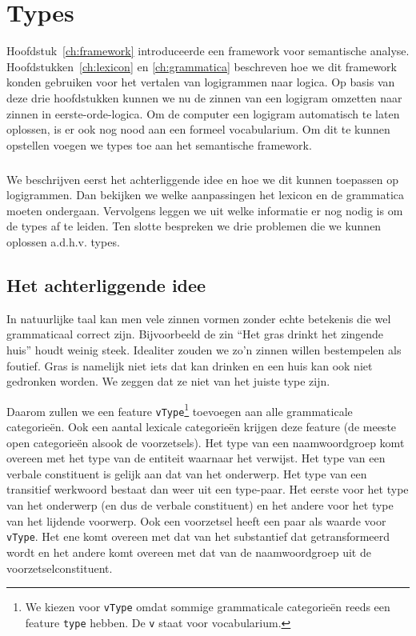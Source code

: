 \chapter{Types}
\label{ch:types}

Hoofdstuk~\ref{ch:framework} introduceerde een framework voor semantische analyse. Hoofdstukken~\ref{ch:lexicon} en \ref{ch:grammatica} beschreven hoe we dit framework konden gebruiken voor het vertalen van logigrammen naar logica. Op basis van deze drie hoofdstukken kunnen we nu de zinnen van een logigram omzetten naar zinnen in eerste-orde-logica. Om de computer een logigram automatisch te laten oplossen, is er ook nog nood aan een formeel vocabularium. Om dit te kunnen opstellen voegen we types toe aan het semantische framework.

\paragraph{} We beschrijven eerst het achterliggende idee en hoe we dit kunnen toepassen op logigrammen. Dan bekijken we welke aanpassingen het lexicon en de grammatica moeten ondergaan. Vervolgens leggen we uit welke informatie er nog nodig is om de types af te leiden. Ten slotte bespreken we drie problemen die we kunnen oplossen a.d.h.v. types.


\section{Het achterliggende idee}
In natuurlijke taal kan men vele zinnen vormen zonder echte betekenis die wel grammaticaal correct zijn. Bijvoorbeeld de zin ``Het gras drinkt het zingende huis'' houdt weinig steek. Idealiter zouden we zo'n zinnen willen bestempelen als foutief. Gras is namelijk niet iets dat kan drinken en een huis kan ook niet gedronken worden. We zeggen dat ze niet van het juiste type zijn.

Daarom zullen we een feature \texttt{vType}\footnote{We kiezen voor \texttt{vType} omdat sommige grammaticale categorieën reeds een feature \texttt{type} hebben. De \texttt{v} staat voor vocabularium.} toevoegen aan alle grammaticale categorieën. Ook een aantal lexicale categorieën krijgen deze feature (de meeste open categorieën alsook de voorzetsels). Het type van een naamwoordgroep komt overeen met het type van de entiteit waarnaar het verwijst. Het type van een verbale constituent is gelijk aan dat van het onderwerp. Het type van een transitief werkwoord bestaat dan weer uit een type-paar. Het eerste voor het type van het onderwerp (en dus de verbale constituent) en het andere voor het type van het lijdende voorwerp. Ook een voorzetsel heeft een paar als waarde voor \texttt{vType}. Het ene komt overeen met dat van het substantief dat getransformeerd wordt en het andere komt overeen met dat van de naamwoordgroep uit de voorzetselconstituent.

